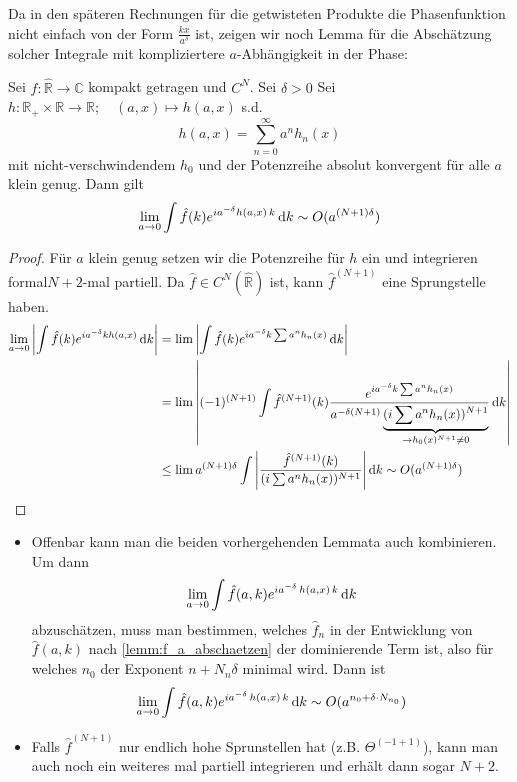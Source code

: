 Da in den späteren Rechnungen für die getwisteten Produkte die Phasenfunktion nicht einfach von der Form \(\frac{k x}{a^{\delta}}\) ist, zeigen wir noch Lemma für die Abschätzung solcher Integrale mit kompliziertere $a$-Abhängigkeit in der Phase:

\begin{lemma}
\label{lemm:f_a_komplizierte_phase}
Sei \(\hat f:\hat{\mathbb{R}} \to \mathbb{C}\) kompakt getragen und \(C^N\). Sei \(\delta > 0\)
Sei \(h: \mathbb{R}_+ \times \mathbb{R} \to \mathbb{R}; \quad (a,x) \mapsto h(a,x)\) s.d.
\begin{equation*}
    h(a,x) = \sum_{n=0}^\infty a^n h_n(x)
\end{equation*}
mit nicht-verschwindendem \(h_0\) und der Potenzreihe absolut konvergent für alle \(a\) klein genug. Dann gilt
\begin{equation*}
    \lim_{a \to 0} \int \hat f(k) e^{i a^{-\delta} h(a,x)\,k} \mathop{}\!\mathrm{d} k
    \sim O(a^{(N+1) \delta})
\end{equation*}
\end{lemma}

\begin{proof}
Für \(a\) klein genug setzen wir die Potenzreihe für \(h\) ein und integrieren formal\(N+2\)-mal partiell. Da \( \hat f \in C^N(\hat{\mathbb{R}})\) ist, kann \(\hat f^{(N+1)}\) eine Sprungstelle haben.
\begin{align*}
    \lim_{a \to 0}
    \left\lvert \int \hat f(k) e^{ia^{-\delta}kh(a,x)} \mathop{}\!\mathrm{d} k \right\rvert
    &=
    \lim
    \left\lvert
        \int  \hat f(k) e^{ia^{-\delta}k\sum a^n h_n(x)} \mathop{}\!\mathrm{d} k
    \right\rvert
    \\ &=
    \lim
    \left\lvert
        (-1)^{(N+1)} \int \hat f^{(N+1)}(k) \frac{e^{ia^{-\delta}k\sum a^n h_n(x)}}
        {a^{-\delta (N+1)}\underbrace{(i \sum a^n h_n(x))^{N+1}}_{\to h_0(x)^{N+1} \neq 0}}
        \mathop{}\!\mathrm{d} k
    \right\rvert
    \\ &\leq \lim
    a^{(N+1) \delta} \int \left\lvert \frac{\hat f^{(N+1)}(k)}{(i \sum a^n h_n(x))^{N+1}} \right\rvert \mathop{}\!\mathrm{d} k
    \sim O (a^{(N+1) \delta})
\end{align*}
\end{proof}

\begin{remark}
\begin{itemize}
    \item Offenbar kann man die beiden vorhergehenden Lemmata auch kombinieren. Um dann \[\lim_{a \to 0} \int \hat f(a,k) e^{i a^{-\delta}\, h (a,x) \,k} \mathop{}\!\mathrm{d} k\]
    abzuschätzen, muss man bestimmen, welches \(\hat f_n\) in der Entwicklung von \(\hat f(a,k)\) nach \cref{lemm:f_a_abschaetzen} der dominierende Term ist, also für welches \(n_0\) der Exponent \(n+N_n \delta\) minimal wird. Dann ist
    \[
    \lim_{a \to 0} \int \hat f(a,k) e^{i a^{-\delta}\, h (a,x) \,k} \mathop{}\!\mathrm{d} k
    \sim
    O(a^{n_0+\delta \cdot N_{n_0}})
    \]
    \item Falls \(\hat f^{(N+1)}\) nur endlich hohe Sprunstellen hat (z.B. \(\Theta^{(-1+1)}\)), kann man auch noch ein weiteres mal partiell integrieren und erhält dann sogar \(N+2\).
\end{itemize}
\end{remark}

